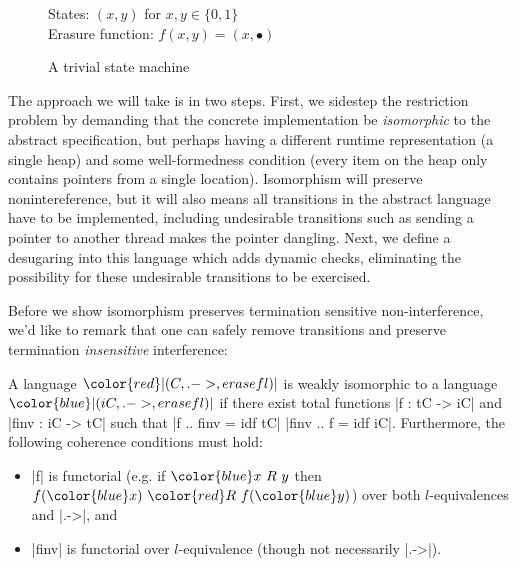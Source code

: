 \begin{figure}
    States: $(x,y)$ for $x,y \in \{0,1\}$ \\
    Erasure function: $f(x,y) = (x,\bullet)$

    \begin{center}\end{center}

    \label{fig:trivial-sm}
    \caption{A trivial state machine}
\end{figure}

The approach we will take is in two steps.  First, we sidestep the
restriction problem by demanding that the concrete implementation be
\emph{isomorphic} to the abstract specification, but perhaps having a different
runtime representation (a single heap) and some well-formedness
condition (every item on the heap only contains pointers from a single
location).  Isomorphism will preserve nonintereference, but it will also means all
transitions in the abstract language have to be implemented, including
undesirable transitions such as sending a pointer to another thread makes
the pointer dangling.  Next, we define a desugaring into this language
which adds dynamic checks, eliminating the possibility for these undesirable
transitions to be exercised.


\newcommand{\con}[1]{\ensuremath{{\color{red} #1}}}
\newcommand{\abs}[1]{\ensuremath{{\color{blue} #1}}}

Before we show isomorphism preserves termination sensitive
non-interference, we'd like to remark that one can safely remove transitions
and preserve termination \emph{insensitive} interference:

\begin{definition}
    A language \con{|(C, .->, erasef l)|} is weakly isomorphic to a
    language \abs{|(iC, .->, erasef l)|} if there exist total functions
    |f : tC -> iC| and |finv : iC -> tC| such that |f .. finv = idf tC|
    |finv .. f = idf iC|.  Furthermore, the following coherence conditions
    must hold:
    \begin{itemize}
        \item |f| is functorial (e.g. if $\abs{x\ R\ y}$ then
            $f(\abs{x})\ \con{R}\ f(\abs{y})$) over both
            $l$-equivalences and |.->|, and
        \item |finv| is functorial over $l$-equivalence (though not necessarily |.->|).
    \end{itemize}
\end{definition}

